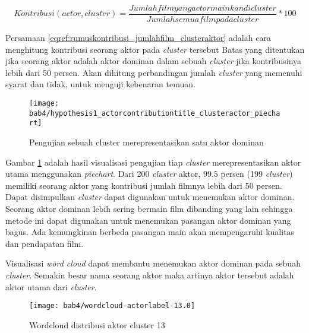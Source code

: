 \begin{equation}
Kontribusi(actor,cluster) =  \frac{Jumlah film yang actor mainkan di cluster}{Jumlah semua film pada cluster} * 100
\label{eqref:rumuskontribusi_jumlahfilm_clusteraktor}
\end{equation}



Persamaan \ref{eqref:rumuskontribusi_jumlahfilm_clusteraktor} adalah cara menghitung kontribusi seorang aktor pada \textit{cluster} tersebut Batas yang ditentukan jika seorang aktor adalah  aktor dominan dalam sebuah \textit{cluster} jika kontribusinya lebih dari 50 persen. Akan dihitung perbandingan jumlah \textit{cluster} yang memenuhi syarat dan tidak, untuk menguji kebenaran temuan. 


\begin{figure}[H]
	\centering  
	\texttt{[image: bab4/hypothesis1\_actorcontributiontitle\_clusteractor\_piechart]}   
	\caption{Pengujian sebuah cluster merepresentasikan satu aktor dominan}	\label{fig:hypothesis1_actorcontributiontitle_clusteractor_piechart} 
\end{figure}


Gambar \ref{fig:hypothesis1_actorcontributiontitle_clusteractor_piechart} adalah hasil  visualisasi pengujian tiap \textit{cluster} merepresentasikan aktor utama menggunakan \textit{piechart}. Dari 200 \textit{cluster} aktor, $99.5$ persen (199 \textit{cluster}) memiliki seorang aktor yang kontribusi jumlah filmnya lebih dari 50 persen. Dapat disimpulkan \textit{cluster} dapat digunakan untuk menemukan aktor dominan. Seorang aktor dominan lebih sering bermain film dibanding yang lain sehingga metode ini dapat digunakan untuk menemukan pasangan aktor dominan yang bagus. Ada kemungkinan berbeda pasangan main akan mempengaruhi kualitas dan pendapatan film. 



Visualisasi \textit{word cloud} dapat membantu menemukan aktor dominan pada sebuah \textit{cluster}. Semakin besar nama seorang aktor maka artinya aktor tersebut adalah aktor utama dari \textit{cluster}. 

 

\begin{figure}[H]
	\centering  
	\texttt{[image: bab4/wordcloud-actorlabel-13.0]}   
	\caption{Wordcloud distribusi aktor cluster 13 }
	\label{fig:wordcloud-actorlabel-13.0} 
\end{figure} 



